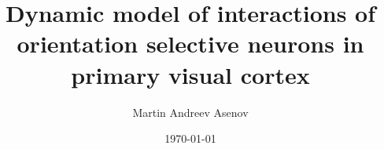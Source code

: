 


\title{Dynamic model of interactions of orientation selective neurons in primary visual cortex}

\author{Martin Andreev Asenov}



\date{\today}


